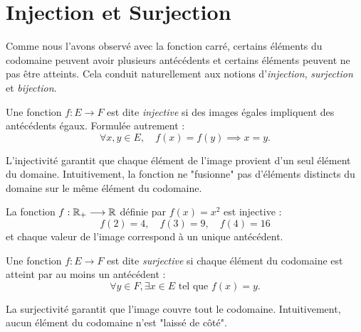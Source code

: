 
\section{Injection et Surjection}

Comme nous l'avons observé avec la fonction carré, certains éléments du codomaine peuvent avoir plusieurs antécédents et certains éléments peuvent ne pas être atteints. Cela conduit naturellement aux notions d'\emph{injection}, \emph{surjection} et \emph{bijection}.


\begin{definition}
    Une fonction $f : E \longrightarrow F$ est dite \emph{injective} si des images égales impliquent des antécédents égaux. Formulée autrement :
    \[
        \forall x,y \in E, \quad f(x) = f(y) \implies x = y.
    \]
\end{definition}

\begin{remark}
    L'injectivité garantit que chaque élément de l'image provient d'un seul élément du domaine. Intuitivement, la fonction ne "fusionne" pas d'éléments distincts du domaine sur le même élément du codomaine.
\end{remark}

\begin{example}
    La fonction $f : \mathbb{R}_+ \longrightarrow \mathbb{R}$ définie par $f(x) = x^2$ est injective :
    \[
        f(2) = 4, \quad f(3) = 9, \quad f(4) = 16
    \]
    et chaque valeur de l'image correspond à un unique antécédent.
\end{example}


\begin{definition}
    Une fonction $f : E \longrightarrow F$ est dite \emph{surjective} si chaque élément du codomaine est atteint par au moins un antécédent :
    \[
        \forall y \in F, \exists x \in E \text{ tel que } f(x) = y.
    \]
\end{definition}

\begin{remark}
    La surjectivité garantit que l'image couvre tout le codomaine. Intuitivement, aucun élément du codomaine n'est "laissé de côté".
\end{remark}

